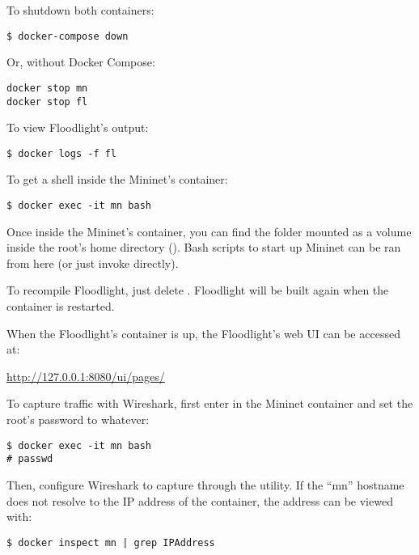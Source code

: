 To shutdown both containers:
\begin{verbatim}
$ docker-compose down
\end{verbatim}

Or, without Docker Compose:
\begin{verbatim}
docker stop mn
docker stop fl
\end{verbatim}

To view Floodlight's output:
\begin{verbatim}
$ docker logs -f fl
\end{verbatim}

To get a shell inside the Mininet's container:
\begin{verbatim}
$ docker exec -it mn bash
\end{verbatim}
Once inside the Mininet's container, you can find the  folder
mounted as a volume inside the root's home directory ().
Bash scripts to start up Mininet can be ran from here (or just invoke 
directly).

To recompile Floodlight, just delete . Floodlight
will be built again when the container is restarted.

When the Floodlight's container is up, the Floodlight's web UI can be accessed
at:

\begin{center}
	\url{http://127.0.0.1:8080/ui/pages/}
\end{center}

To capture traffic with Wireshark, first enter in the Mininet container and set
the root's password to whatever:
\begin{verbatim}
$ docker exec -it mn bash
# passwd
\end{verbatim}

Then, configure Wireshark to capture through the  utility. If the
``mn'' hostname does not resolve to the IP address of the container, the address
can be viewed with:
\begin{verbatim}
$ docker inspect mn | grep IPAddress
\end{verbatim}
